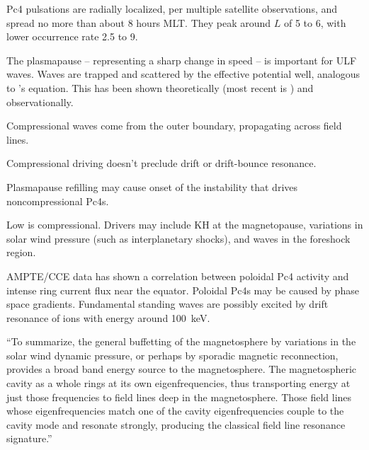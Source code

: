 Pc4 pulsations are radially localized, per multiple satellite observations\cite{engebretson_1992}, and spread no more than about 8 hours MLT. They peak around $L$ of 5 to 6, with lower occurrence rate 2.5 to 9\cite{anderson_1990,liu_2009}.


The plasmapause -- representing a sharp change in \Alfven speed -- is important for ULF waves. Waves are trapped and scattered by the effective potential well, analogous to \Schrodinger's equation\cite{lee_1998,lee_1999,dai_2009}. This has been shown theoretically\cite{klimushkin_1998,leonovich_2000,klimushkin_2004,mager_2013} (most recent is \cite{mager_2013}) and observationally\cite{takahashi_2009,takahashi_2010}. 


Compressional waves come from the outer boundary, propagating across field lines\cite{lysak_1992}. 

Compressional driving doesn't preclude drift or drift-bounce resonance\cite{zong_2007,zong_2009}. 

Plasmapause refilling may cause onset of the instability that drives noncompressional Pc4s\cite{engebretson_1992,liu_2013}. 

Low \azm is compressional\cite{hughes_1994}. Drivers may include KH at the magnetopause\cite{chen_1974,southwood_1974,liu_2011}, variations in solar wind pressure (such as interplanetary shocks)\cite{zong_2007,zong_2009,hao_2014,degeling_2014,kessel_2008}, and waves in the foreshock region\cite{russell_1983,takahashi_2015}. 

AMPTE/CCE data has shown a correlation between poloidal Pc4 activity and intense ring current flux near the equator\cite{engebretson_1988}. Poloidal Pc4s may be caused by phase space gradients\cite{dai_2013}. Fundamental standing waves are possibly excited by drift resonance of ions with energy around \SI{100}{\kilo\eV}\cite{thompson_2001,dai_2013}.

``To summarize, the general buffetting of the magnetosphere by variations in the solar wind dynamic pressure, or perhaps by sporadic magnetic reconnection, provides a broad band energy source to the magnetosphere. The magnetospheric cavity as a whole rings at its own eigenfrequencies, thus transporting energy at just those frequencies to field lines deep in the magnetosphere. Those field lines whose eigenfrequencies match one of the cavity eigenfrequencies couple to the cavity mode and resonate strongly, producing the classical field line resonance signature.\cite{hughes_1994}'' 

